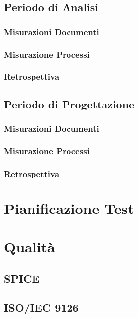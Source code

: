 \documentclass[a4paper, oneside, openany, dvipsnames, table]{article}
\begin{document}
	\label{app:misure}
	\subsection{Periodo di Analisi}
		\subsubsection{Misurazioni Documenti}
			
		\subsubsection{Misurazione Processi}
			
		\subsubsection{Retrospettiva}
			
			
	\subsection{Periodo di Progettazione}
		\subsubsection{Misurazioni Documenti}
			
		\subsubsection{Misurazione Processi}
			
		\subsubsection{Retrospettiva}
			
\newpage
\section{Pianificazione Test}
	
	
\newpage
\section{Qualità}
	\subsection{SPICE}
		\label{app:SPICE}
		
	\subsection{ISO/IEC 9126}
		\label{app:ISO/IEC 9126}
		
\end{document}
